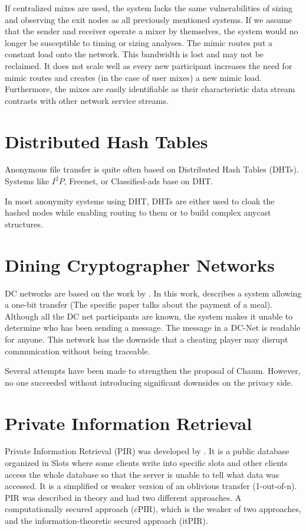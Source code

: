 If centralized mixes are used, the system lacks the same vulnerabilities of sizing and observing the exit nodes as all previously mentioned systems. If we assume that the sender and receiver operate a mixer by themselves, the system would no longer be susceptible to timing or sizing analyses. The mimic routes put a constant load onto the network. This bandwidth is lost and may not be reclaimed. It does not scale well as every new participant increases the need for mimic routes and creates (in the case of user mixes) a new mimic load. Furthermore, the mixes are easily identifiable as their characteristic data stream contrasts with other network service streams.

\section{Distributed Hash Tables}
Anonymous file transfer is quite often based on Distributed Hash Tables (DHTs). Systems like $I^2P$, Freenet, or Classified-ads base on DHT.

In most anonymity systems using DHT, DHTs are either used to cloak the hashed nodes while enabling routing to them or to build complex anycast structures.

\section{Dining Cryptographer Networks}
DC networks are based on the work  by \citeauthor{chaum-dc}\cite{chaum-dc}. In this work, \citeauthor{chaum-dc} describes a system allowing a one-bit transfer (The specific paper talks about the payment of a meal). Although all the DC net participants are known, the system makes it unable to determine who has been sending a message. The message in a DC-Net is readable for anyone. This network has the downside that a cheating player may disrupt communication without being traceable.

Several attempts have been made to strengthen the proposal of Chaum\cite{golle:eurocrypt2004,disco,herbivore:tr,Corrigan-Gibbs:2010:DAA:1866307.1866346}. However, no one succeeded without introducing significant downsides on the privacy side.

\section{Private Information Retrieval}
Private Information Retrieval (PIR)\cite{chor1995private} was developed by \citeauthor{chor1995private}. It is a  public database organized in Slots where some clients write into specific slots and other clients access the whole database so that the server is unable to tell what data was accessed. It is a simplified or weaker version of an oblivious transfer (1-out-of-n). PIR was described in theory and had two different approaches. A computationally secured approach (cPIR), which is the weaker of two approaches, and the information-theoretic secured approach (itPIR).

